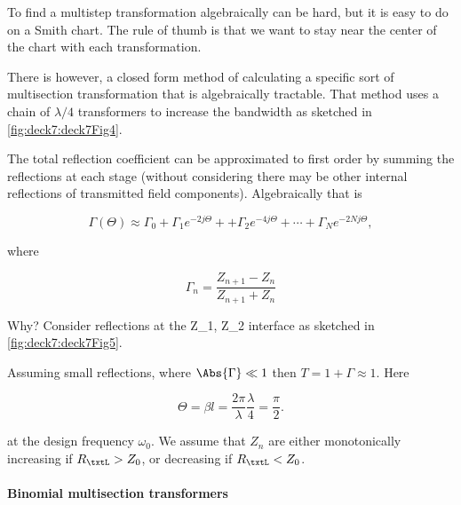 To find a multistep transformation algebraically can be hard, but it is easy to do on a Smith chart.  The rule of thumb is that we want to stay near the center of the chart with each transformation.

There is however, a closed form method of calculating a specific sort of multisection transformation that is algebraically tractable.  That method uses a chain of \( \lambda/4 \) transformers to increase the bandwidth as sketched in \cref{fig:deck7:deck7Fig4}.


The total reflection coefficient can be approximated to first order by summing the reflections at each stage (without considering there may be other internal reflections of transmitted field components).  Algebraically that is

\begin{equation}\label{eqn:uwavesDeck7MultisectionTransformersCore:60}
\Gamma(\Theta) \approx \Gamma_0 
+ \Gamma_1 e^{-2 j \Theta} + 
+ \Gamma_2 e^{-4 j \Theta} +  \cdots
+ \Gamma_N e^{-2 N j \Theta},
\end{equation}

where

\begin{equation}\label{eqn:uwavesDeck7MultisectionTransformersCore:80}
\Gamma_n = \frac{Z_{n+1} - Z_n}{Z_{n+1} + Z_n}
\end{equation}

Why?  Consider reflections at the Z_1, Z_2 interface as sketched in \cref{fig:deck7:deck7Fig5}.


Assuming small reflections, where \( \Abs{\Gamma} \ll 1 \) then \( T = 1 + \Gamma \approx 1 \).  Here

\begin{dmath}\label{eqn:uwavesDeck7MultisectionTransformersCore:100}
\Theta 
= \beta l 
= \frac{2 \pi}{\lambda} \frac{\lambda}{4} 
= \frac{\pi}{2}.
\end{dmath}

at the design frequency \( \omega_0 \).  We assume that \( Z_n \) are either monotonically increasing if \( R_\txtL > Z_0 \), or decreasing if \( R_\txtL < Z_0 \).

\paragraph{Binomial multisection transformers}


